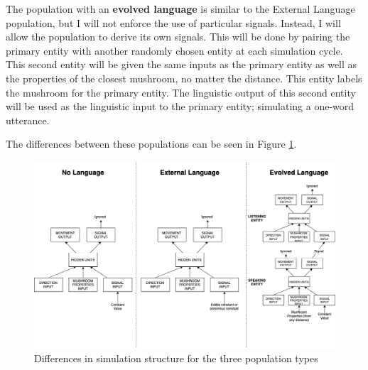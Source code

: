\documentclass[12pt,a4paper,twoside,openright]{report}
\begin{document}
The population with an {\bf evolved language} is similar to the External Language population, but I will not enforce the use of particular signals. Instead, I will allow the population to derive its own signals. This will be done by pairing the primary entity with another randomly chosen entity at each simulation cycle. This second entity will be given the same inputs as the primary entity as well as the properties of the closest mushroom, no matter the distance. This entity labels the mushroom for the primary entity. The linguistic output of this second entity will be used as the linguistic input to the primary entity; simulating a one-word utterance.

The differences between these populations can be seen in Figure \ref{fig:populations}.

\begin{figure}[t]
  \centering
  \includegraphics[width=1.\linewidth]{figs/populations}
  \caption{Differences in simulation structure for the three population types}
  \label{fig:populations}
\end{figure}
\end{document}
